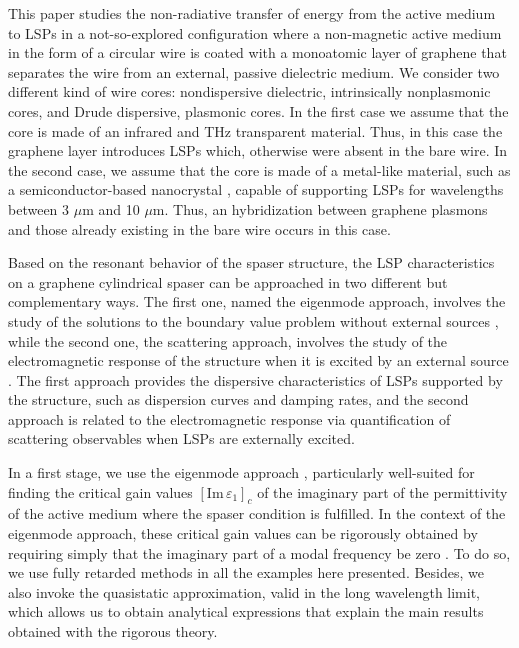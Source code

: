\documentclass[9pt,twocolumn,twoside]{osajnl}
\begin{document}
%
%
This paper 
studies the non-radiative transfer of energy from the active medium to LSPs in a not-so-explored configuration where a non-magnetic active medium in the form of a circular wire is coated with a monoatomic layer of graphene that separates the wire from an external, passive dielectric medium. 
%
We consider two different kind of wire cores: nondispersive dielectric, intrinsically nonplasmonic cores, and Drude dispersive, plasmonic cores. In the first case we assume that the core is made of an infrared and THz transparent material. Thus, in this case the graphene layer introduces LSPs 
which, otherwise were absent in the bare wire. 
%
In the second case, we assume that the core is made of a metal-like material, such as a semiconductor-based nanocrystal \cite{nanocristal2,nanocristal1,nanocristal4}, capable of supporting LSPs %
for wavelengths between 3 $\mu$m and 10 $\mu$m. Thus, an hybridization between graphene plasmons and those already existing in the bare wire occurs in this case. 
%
%

Based on the resonant behavior of the spaser structure, the LSP characteristics on a graphene cylindrical spaser can be approached in two different but complementary ways. The first one, named the eigenmode approach, involves the  study of  the solutions to the boundary value problem without external sources \cite{CRD},  while the second one, the scattering approach, involves the  study of the electromagnetic response of the structure when it is excited by an external source \cite{maximo1}. The first approach provides the dispersive characteristics of LSPs supported by the structure, such as dispersion curves and damping rates, and the second approach is related to the electromagnetic response %
via quantification of scattering observables 
when LSPs are externally excited. %
%

In a first stage, we use the eigenmode approach \cite{CRD}, particularly well-suited for finding the critical gain values $[\text{Im}\,\varepsilon_1 ]_c$ 
of the imaginary part of the permittivity of the active medium where the spaser condition is fulfilled.  In the context of the eigenmode approach, these critical gain values can be rigorously obtained by requiring simply that the imaginary part of a modal frequency be zero \cite{smotrova2011,nosich,passarelli2019}. To do so, we use fully retarded methods in all the examples here presented. Besides, we also invoke the quasistatic approximation, valid in the long  wavelength limit, which allows us to obtain analytical expressions that explain the main results obtained with the rigorous theory. 
\end{document}
